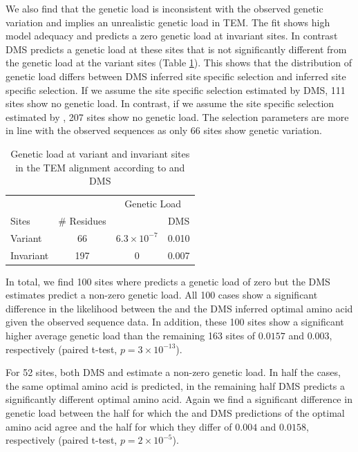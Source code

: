 \documentclass[12pt]{article}
\begin{document}
We also find that the genetic load is inconsistent with the observed genetic variation and implies an unrealistic genetic load in TEM.
The \selac fit shows high model adequacy and predicts a zero genetic load at invariant sites.
In contrast DMS predicts a genetic load at these sites that is not significantly different from the genetic load at the variant sites (Table \ref{tab:selection}).
This shows that the distribution of genetic load differs between DMS inferred site specific selection and \selac inferred site specific selection.
If we assume the site specific selection estimated by DMS, 111 sites show no genetic load.
In contrast, if we assume the site specific selection estimated by \selac, 207 sites show no genetic load.
The \selac selection parameters are more in line with the observed sequences as only 66 sites show genetic variation.

\begin{table}
  \centering
  \caption{Genetic load at variant and invariant sites in the TEM alignment according to \selac and DMS}
  \begin{tabular}{lccc}
    \hline
			& 		& \multicolumn{2}{c}{Genetic Load}  \\ 
    Sites 		& \# Residues	& \multicolumn{1}{c}{\selac} & \multicolumn{1}{c}{DMS} \\ \hline 
    Variant	&	66	& $6.3\times10^{-7}$ & 0.010  \\
    Invariant		& 	197	& 0 & 0.007 \\
  \end{tabular}
  \label{tab:selection}
\end{table}


In total, we find 100 sites where \selac predicts a genetic load of zero but the DMS estimates predict a non-zero genetic load.
All 100 cases show a significant difference in the likelihood between the \selac and the DMS inferred optimal amino acid given the observed sequence data.
In addition, these 100 sites show a significant higher average genetic load than the remaining 163 sites of $0.0157$ and $0.003$, respectively (paired t-test, $p = 3\times10^{-13}$).

For 52 sites, both DMS and \selac estimate a non-zero genetic load.
In half the cases, the same optimal amino acid is predicted, in the remaining half DMS predicts a significantly different optimal amino acid.
Again we find a significant difference in genetic load between the half for which the \selac and DMS predictions of the optimal amino acid agree and the half for which they differ of $0.004$ and $0.0158$, respectively (paired t-test, $p = 2\times10^{-5}$).
\end{document}
